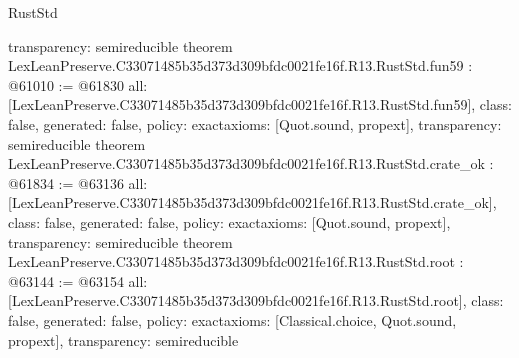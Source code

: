 \begin{lexlean}{RustStd}
\begin{coremodule}
{  transparency: semireducible
}
theorem LexLeanPreserve.C33071485b35d373d309bfdc0021fe16f.R13.RustStd.fun59 : @61010 := @61830 {
  all: [LexLeanPreserve.C33071485b35d373d309bfdc0021fe16f.R13.RustStd.fun59],
  class: false,
  generated: false,
  policy: exact{axioms: [Quot.sound, propext]},
  transparency: semireducible
}
theorem LexLeanPreserve.C33071485b35d373d309bfdc0021fe16f.R13.RustStd.crate_ok : @61834 := @63136 {
  all: [LexLeanPreserve.C33071485b35d373d309bfdc0021fe16f.R13.RustStd.crate_ok],
  class: false,
  generated: false,
  policy: exact{axioms: [Quot.sound, propext]},
  transparency: semireducible
}
theorem LexLeanPreserve.C33071485b35d373d309bfdc0021fe16f.R13.RustStd.root : @63144 := @63154 {
  all: [LexLeanPreserve.C33071485b35d373d309bfdc0021fe16f.R13.RustStd.root],
  class: false,
  generated: false,
  policy: exact{axioms: [Classical.choice, Quot.sound, propext]},
  transparency: semireducible
}


\end{coremodule}
\end{lexlean}
